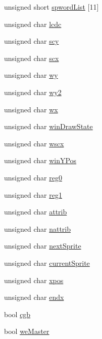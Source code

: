 \begin{DoxyCompactItemize}
\item 
unsigned short \hyperlink{structgambatte_1_1PPUPriv_a0f189a633ec3c52b37c9a4be0e96b0cd}{spword\+List} \mbox{[}11\mbox{]}
\item 
unsigned char \hyperlink{structgambatte_1_1PPUPriv_a0e002a001d442d0812736deebd0ba8a1}{lcdc}
\item 
unsigned char \hyperlink{structgambatte_1_1PPUPriv_ac632ba178ee2a53eeb3c98ba13ccc2f5}{scy}
\item 
unsigned char \hyperlink{structgambatte_1_1PPUPriv_af0eae48a849f8cbc06aae956a7e49013}{scx}
\item 
unsigned char \hyperlink{structgambatte_1_1PPUPriv_ace53d0c7b78b568c3ea61b5cd1e39335}{wy}
\item 
unsigned char \hyperlink{structgambatte_1_1PPUPriv_ab2750eac66df777b012b49230730e882}{wy2}
\item 
unsigned char \hyperlink{structgambatte_1_1PPUPriv_a856679c933aab3b5b8846bba59c48e9f}{wx}
\item 
unsigned char \hyperlink{structgambatte_1_1PPUPriv_af25bb3f5b0c93b56d52ac215c8ce2c82}{win\+Draw\+State}
\item 
unsigned char \hyperlink{structgambatte_1_1PPUPriv_a8fdaf8c8c95c7f25392cd2493596946d}{wscx}
\item 
unsigned char \hyperlink{structgambatte_1_1PPUPriv_a1be79e58a77b74d538d5ebdd8d60c6a7}{win\+Y\+Pos}
\item 
unsigned char \hyperlink{structgambatte_1_1PPUPriv_a080d0f22488a104968b72ae88751b7f7}{reg0}
\item 
unsigned char \hyperlink{structgambatte_1_1PPUPriv_a2e589d6d9b5dd0e6f1393eebf263c34a}{reg1}
\item 
unsigned char \hyperlink{structgambatte_1_1PPUPriv_aaf0ca257e082d1eb7ce037e30732893e}{attrib}
\item 
unsigned char \hyperlink{structgambatte_1_1PPUPriv_a62474f22358b00e753c223f75e7d508f}{nattrib}
\item 
unsigned char \hyperlink{structgambatte_1_1PPUPriv_a113d8a8946f77a82a8953a3a4abdf8ca}{next\+Sprite}
\item 
unsigned char \hyperlink{structgambatte_1_1PPUPriv_a0819fddb4da717d7d7ae47262805c696}{current\+Sprite}
\item 
unsigned char \hyperlink{structgambatte_1_1PPUPriv_affeb43eafa62f83c593b3cb14d6241c7}{xpos}
\item 
unsigned char \hyperlink{structgambatte_1_1PPUPriv_a0cbb04bac94de5bc8263a950f4c69033}{endx}
\item 
bool \hyperlink{structgambatte_1_1PPUPriv_a174cd412c81a0bbfe392d34a181e201d}{cgb}
\item 
bool \hyperlink{structgambatte_1_1PPUPriv_ac8b946a2ce5fe6c67159b30d5bae282e}{we\+Master}
\end{DoxyCompactItemize}


